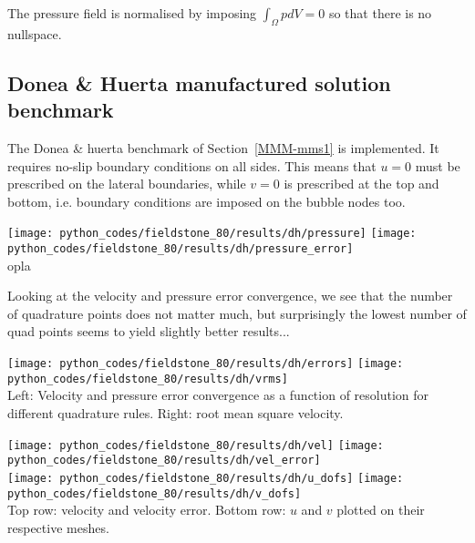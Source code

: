 The pressure field is normalised by imposing $\int_\Omega p dV=0 $ so that there is no nullspace.

\subsection*{Donea \& Huerta manufactured solution benchmark}

The Donea \& huerta benchmark of Section~\ref{MMM-mms1} is implemented. It requires 
no-slip boundary conditions on all sides. This means that $u=0$ must be 
prescribed on the lateral boundaries, while $v=0$ is prescribed at the top and bottom, 
i.e. boundary conditions are imposed on the bubble nodes too.

\begin{center}
\texttt{[image: python\_codes/fieldstone\_80/results/dh/pressure]}
\texttt{[image: python\_codes/fieldstone\_80/results/dh/pressure\_error]}\\
{\captionfont  opla}
\end{center}


Looking at the velocity and pressure error convergence, we see that the number of quadrature
points does not matter much, but surprisingly the lowest number of quad points seems to yield slightly
better results...
\begin{center}
\texttt{[image: python\_codes/fieldstone\_80/results/dh/errors]}
\texttt{[image: python\_codes/fieldstone\_80/results/dh/vrms]}\\
{\captionfont Left: Velocity and pressure error convergence as a function of resolution for 
different quadrature rules. Right: root mean square velocity.}
\end{center}

\begin{center}
\texttt{[image: python\_codes/fieldstone\_80/results/dh/vel]}
\texttt{[image: python\_codes/fieldstone\_80/results/dh/vel\_error]}\\
\texttt{[image: python\_codes/fieldstone\_80/results/dh/u\_dofs]}
\texttt{[image: python\_codes/fieldstone\_80/results/dh/v\_dofs]}\\
{\captionfont Top row: velocity and velocity error. Bottom row: $u$ and 
$v$ plotted on their respective meshes.}
\end{center}

